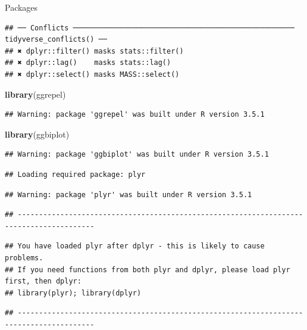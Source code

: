 \documentclass[ignorenonframetext,]{beamer}
\newenvironment{Shaded}{\begin{snugshade}}{\end{snugshade}}
\newcommand{\KeywordTok}[1]{\textcolor[rgb]{0.13,0.29,0.53}{\textbf{#1}}}
\newcommand{\NormalTok}[1]{#1}
\begin{document}
\begin{frame}[fragile]{Packages}
\begin{verbatim}
## ── Conflicts ──────────────────────────────────────────────────── tidyverse_conflicts() ──
## ✖ dplyr::filter() masks stats::filter()
## ✖ dplyr::lag()    masks stats::lag()
## ✖ dplyr::select() masks MASS::select()
\end{verbatim}

\begin{Shaded}
\begin{Highlighting}[]
\KeywordTok{library}\NormalTok{(ggrepel)}
\end{Highlighting}
\end{Shaded}

\begin{verbatim}
## Warning: package 'ggrepel' was built under R version 3.5.1
\end{verbatim}

\begin{Shaded}
\begin{Highlighting}[]
\KeywordTok{library}\NormalTok{(ggbiplot)}
\end{Highlighting}
\end{Shaded}

\begin{verbatim}
## Warning: package 'ggbiplot' was built under R version 3.5.1
\end{verbatim}

\begin{verbatim}
## Loading required package: plyr
\end{verbatim}

\begin{verbatim}
## Warning: package 'plyr' was built under R version 3.5.1
\end{verbatim}

\begin{verbatim}
## ----------------------------------------------------------------------------------------
\end{verbatim}

\begin{verbatim}
## You have loaded plyr after dplyr - this is likely to cause problems.
## If you need functions from both plyr and dplyr, please load plyr first, then dplyr:
## library(plyr); library(dplyr)
\end{verbatim}

\begin{verbatim}
## ----------------------------------------------------------------------------------------
\end{verbatim}


\end{frame}
\end{document}

